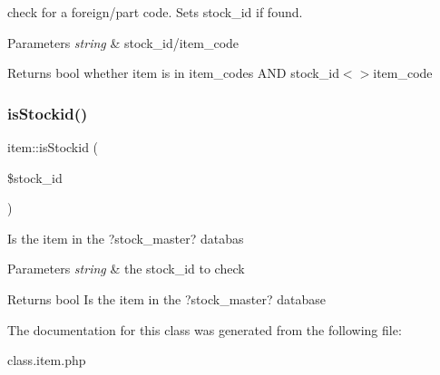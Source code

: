 check for a foreign/part code. Sets stock\+\_\+id if found.


\begin{DoxyParams}{Parameters}
{\em string} & stock\+\_\+id/item\+\_\+code \\
\hline
\end{DoxyParams}
\begin{DoxyReturn}{Returns}
bool whether item is in item\+\_\+codes A\+ND stock\+\_\+id$<$$>$item\+\_\+code 
\end{DoxyReturn}
\hypertarget{classitem_a17a922f5ec3b2241675aea5ef0fdc8d5}{}\label{classitem_a17a922f5ec3b2241675aea5ef0fdc8d5} 
\subsubsection{\texorpdfstring{is\+Stockid()}{isStockid()}}
{\footnotesize\ttfamily item\+::is\+Stockid (\begin{DoxyParamCaption}\item[{}]{\$stock\+\_\+id }\end{DoxyParamCaption})}

Is the item in the ?stock\+\_\+master? databas


\begin{DoxyParams}{Parameters}
{\em string} & the stock\+\_\+id to check \\
\hline
\end{DoxyParams}
\begin{DoxyReturn}{Returns}
bool Is the item in the ?stock\+\_\+master? database 
\end{DoxyReturn}


The documentation for this class was generated from the following file\+:\begin{DoxyCompactItemize}
\item 
class.\+item.\+php\end{DoxyCompactItemize}
